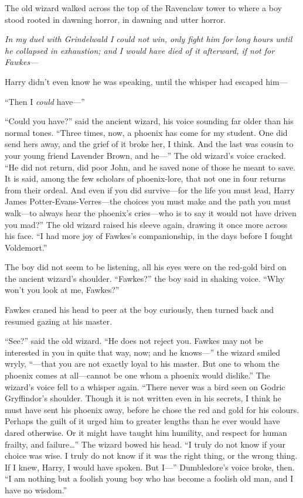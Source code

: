 The old wizard walked across the top of the Ravenclaw tower to where a
boy stood rooted in dawning horror, in dawning and utter horror.

\emph{In my duel with Grindelwald I could not win, only fight him for
long hours until he collapsed in exhaustion; and I would have died of it
afterward, if not for Fawkes---}

Harry didn't even know he was speaking, until the whisper had escaped
him---

``Then I \emph{could} have---''

``Could you have?'' said the ancient wizard, his voice sounding far
older than his normal tones. ``Three times, now, a phoenix has come for
my student. One did send hers away, and the grief of it broke her, I
think. And the last was cousin to your young friend Lavender Brown, and
he---'' The old wizard's voice cracked. ``He did not return, did poor
John, and he saved none of those he meant to save. It is said, among the
few scholars of phoenix-lore, that not one in four returns from their
ordeal. And even if you did survive---for the life you must lead, Harry
James Potter-Evans-Verres---the choices you must make and the path you
must walk---to always hear the phoenix's cries---who is to say it would
not have driven you mad?'' The old wizard raised his sleeve again,
drawing it once more across his face. ``I had more joy of Fawkes's
companionship, in the days before I fought Voldemort.''

The boy did not seem to be listening, all his eyes were on the red-gold
bird on the ancient wizard's shoulder. ``Fawkes?'' the boy said in
shaking voice. ``Why won't you look at me, Fawkes?''

Fawkes craned his head to peer at the boy curiously, then turned back
and resumed gazing at his master.

``See?'' said the old wizard. ``He does not reject you. Fawkes may not
be interested in you in quite that way, now; and he knows---'' the
wizard smiled wryly, ``---that you are not exactly loyal to his master.
But one to whom the phoenix comes at all---cannot be one whom a phoenix
would dislike.'' The wizard's voice fell to a whisper again. ``There
never was a bird seen on Godric Gryffindor's shoulder. Though it is not
written even in his secrets, I think he must have sent his phoenix away,
before he chose the red and gold for his colours. Perhaps the guilt of
it urged him to greater lengths than he ever would have dared otherwise.
Or it might have taught him humility, and respect for human frailty, and
failure\ldots{}'' The wizard bowed his head. ``I truly do not know if
your choice was wise. I truly do not know if it was the right thing, or
the wrong thing. If I knew, Harry, I would have spoken. But I---''
Dumbledore's voice broke, then. ``I am nothing but a foolish young boy
who has become a foolish old man, and I have no wisdom.''

